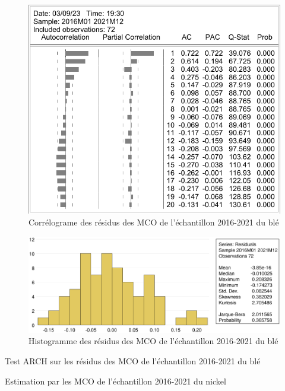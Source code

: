 \documentclass[12pt,a4paper]{article}
\begin{document}
\begin{figure}[H]
    \centering
    \label{fig:mco_cor_ble21}
    \includegraphics[]{annexe/3_2_mco_corr_ble.pdf}
    \caption{Corrélograme des résidus des MCO de l'échantillon 2016-2021 du blé}
\end{figure}

\begin{figure}[H]
    \centering
    \includegraphics[width=\textwidth]{annexe/3_2_mco_hist_ble.eps}
    \caption{Histogramme des résidus des MCO de l'échantillon 2016-2021 du blé}
    \label{fig:mco_hist_ble21}
\end{figure}

\begin{table}[H]
    \centering
    \caption{Test ARCH sur les résidus des MCO de l'échantillon 2016-2021 du blé}
    \sffamily
    
    \label{tab:mco_homo_ble19}
\end{table}

\begin{table}[H]
    \centering
    \caption{Estimation par les MCO de l'échantillon 2016-2021 du nickel}
    \sffamily
    \label{tab:mco_nickel21}
    
\end{table}
\end{document}
